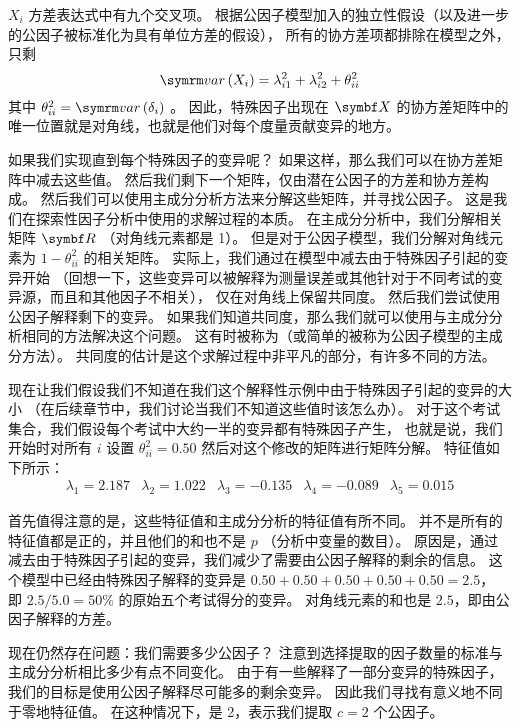 $ X_i $ 方差表达式中有九个交叉项。
根据公因子模型加入的独立性假设（以及进一步的公因子被标准化为具有单位方差的假设），
所有的协方差项都排除在模型之外，只剩
\begin{equation}
    \var{X_i} = \lambda_{i1}^2 + \lambda_{i2}^2 + \theta_{ii}^2
\end{equation}
其中 $ \theta_{ii}^2 = \var{\delta_i} $ 。
因此，特殊因子出现在 $ \vX $ 的协方差矩阵中的唯一位置就是对角线，也就是他们对每个度量贡献变异的地方。

如果我们实现直到每个特殊因子的变异呢？
如果这样，那么我们可以在协方差矩阵中减去这些值。
然后我们剩下一个矩阵，仅由潜在公因子的方差和协方差构成。
然后我们可以使用主成分分析方法来分解这些矩阵，并寻找公因子。
这是我们在探索性因子分析中使用的求解过程的本质。
在主成分分析中，我们分解相关矩阵 $ \vR $ （对角线元素都是 1）。
但是对于公因子模型，我们分解对角线元素为 $ 1 - \theta_{ii}^2 $ 的相关矩阵。
实际上，我们通过在模型中减去由于特殊因子引起的变异开始
（回想一下，这些变异可以被解释为测量误差或其他针对于不同考试的变异源，而且和其他因子不相关），
仅在对角线上保留共同度。
然后我们尝试使用公因子解释剩下的变异。
如果我们知道共同度，那么我们就可以使用与主成分分析相同的方法解决这个问题。
这有时被称为（或简单的被称为公因子模型的主成分方法）。
共同度的估计是这个求解过程中非平凡的部分，有许多不同的方法。

现在让我们假设我们不知道在我们这个解释性示例中由于特殊因子引起的变异的大小
（在后续章节中，我们讨论当我们不知道这些值时该怎么办）。
对于这个考试集合，我们假设每个考试中大约一半的变异都有特殊因子产生，
也就是说，我们开始时对所有 $ i $ 设置 $ \theta_{ii}^2 = 0.50 $ 
然后对这个修改的矩阵进行矩阵分解。
特征值如下所示：
\begin{equation}
    \begin{array}{ccccc}
        \lambda_1 = 2.187 &
        \lambda_2 = 1.022 &
        \lambda_3 = -0.135 &
        \lambda_4 = -0.089 &
        \lambda_5 = 0.015 
    \end{array}
\end{equation}

首先值得注意的是，这些特征值和主成分分析的特征值有所不同。
并不是所有的特征值都是正的，并且他们的和也不是 $ p $ （分析中变量的数目）。
原因是，通过减去由于特殊因子引起的变异，我们减少了需要由公因子解释的剩余的信息。
这个模型中已经由特殊因子解释的变异是 $ 0.50 + 0.50 + 0.50 + 0.50 + 0.50 = 2.5 $，
即 $ 2.5/5.0 = 50\% $ 的原始五个考试得分的变异。
对角线元素的和也是 $ 2.5 $，即由公因子解释的方差。

现在仍然存在问题：我们需要多少公因子？
注意到选择提取的因子数量的标准与主成分分析相比多少有点不同变化。
由于有一些解释了一部分变异的特殊因子，我们的目标是使用公因子解释尽可能多的剩余变异。
因此我们寻找有意义地不同于零地特征值。
在这种情况下，是 2，表示我们提取 $ c = 2 $ 个公因子。


